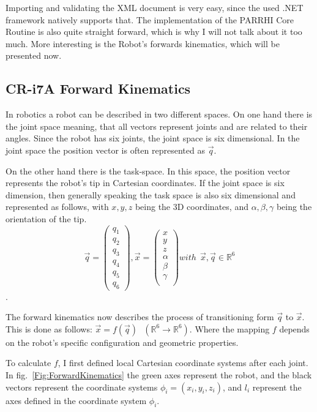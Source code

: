 Importing and validating the XML document is very easy, since the used .NET framework natively supports that. The implementation of the PARRHI Core Routine is also quite straight forward, which is why I will not talk about it too much. More interesting is the Robot's forwards kinematics, which will be presented now.

\subsection{CR-i7A Forward Kinematics}
In robotics a robot can be described in two different spaces. On one hand there is the joint space meaning, that all vectors represent joints and are related to their angles. Since the robot has six joints, the joint space is six dimensional. In the joint space the position vector is often represented as $ \vec{q} $.

On the other hand there is the task-space. In this space, the position vector represents the robot's tip in Cartesian coordinates. If the joint space is six dimension, then generally speaking the task space is also six dimensional and represented as follows, with $x,y,z$ being the 3D coordinates, and $\alpha, \beta, \gamma $ being the orientation of the tip.
\[ \vec{q} = \begin{pmatrix} q_1 \\ q_2 \\ q_3 \\ q_4 \\ q_5 \\ q_6 \end{pmatrix}, \vec{x} = \begin{pmatrix} x \\ y \\ z \\ \alpha \\ \beta \\ \gamma \\ \end{pmatrix} with~~\vec{x},\vec{q} \in \mathbb{R}^6  \]. 

The forward kinematics now describes the process of transitioning form $ \vec{q} $ to $ \vec{x} $. This is done as follows: $ \vec{x} = f(\vec{q})~~~( \mathbb{R}^6 \rightarrow \mathbb{R}^6)$. Where the mapping $f$ depends on the robot's specific configuration and geometric properties.

To calculate $f$, I first defined local Cartesian coordinate systems after each joint. In fig.~\ref{Fig:ForwardKinematics} the green axes represent the robot, and the black vectors represent the coordinate systems $\phi_i = (x_i, y_i, z_i)$, and $l_i$ represent the axes defined in the coordinate system $\phi_i$.

